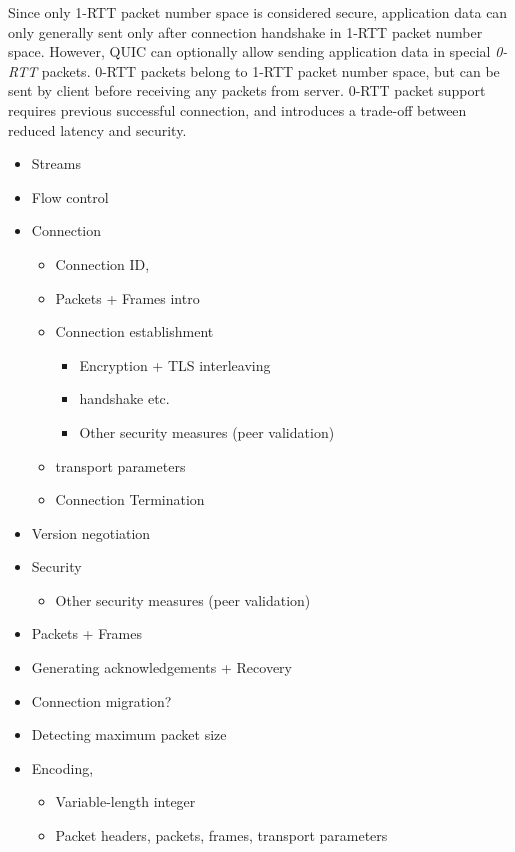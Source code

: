 Since only 1-RTT packet number space is considered secure, application data can only generally sent
only after connection handshake in 1-RTT packet number space. However, QUIC can optionally allow
sending application data in special \textit{0-RTT} packets. 0-RTT packets belong to 1-RTT packet
number space, but can be sent by client before receiving any packets from server. 0-RTT packet
support requires previous successful connection, and introduces a trade-off between reduced latency
and security.

\begin{itemize}

  \item Streams
  \item Flow control

  \item Connection
    \begin{itemize}
      \item Connection ID,
      \item Packets + Frames intro
      \item Connection establishment
        \begin{itemize}
          \item Encryption + TLS interleaving
          \item  handshake etc.
          \item Other security measures (peer validation)
        \end{itemize}
      \item transport parameters
      \item Connection Termination
    \end{itemize}
  \item Version negotiation
  \item Security
    \begin{itemize}
      \item Other security measures (peer validation)
    \end{itemize}
  \item Packets + Frames
  \item Generating acknowledgements + Recovery

  \item Connection migration?

  \item Detecting maximum packet size
  \item Encoding,
    \begin{itemize}
      \item Variable-length integer
      \item Packet headers, packets, frames, transport parameters
    \end{itemize}

\end{itemize}

